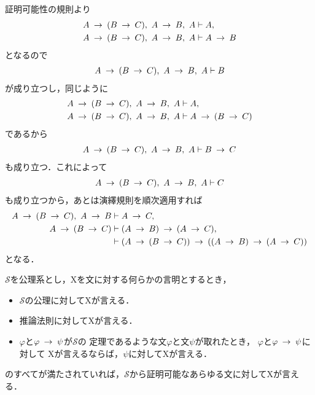 	\begin{prf}
		証明可能性の規則より
		\begin{align}
			A \rarrow (B \rarrow C),\ A \rarrow B,\ A
			&\vdash A, \\
			A \rarrow (B \rarrow C),\ A \rarrow B,\ A
			&\vdash A \rarrow B
		\end{align}
		となるので
		\begin{align}
			A \rarrow (B \rarrow C),\ A \rarrow B,\ A
			\vdash B
		\end{align}
		が成り立つし，同じように
		\begin{align}
			A \rarrow (B \rarrow C),\ A \rarrow B,\ A
			&\vdash A, \\
			A \rarrow (B \rarrow C),\ A \rarrow B,\ A
			&\vdash A \rarrow (B \rarrow C)
		\end{align}
		であるから
		\begin{align}
			A \rarrow (B \rarrow C),\ A \rarrow B,\ A
			\vdash B \rarrow C
		\end{align}
		も成り立つ．これによって
		\begin{align}
			A \rarrow (B \rarrow C),\ A \rarrow B,\ A
			\vdash C
		\end{align}
		も成り立つから，あとは演繹規則を順次適用すれば
		\begin{align}
			A \rarrow (B \rarrow C),\ A \rarrow B
			&\vdash A \rarrow C, \\
			A \rarrow (B \rarrow C)
			&\vdash (A \rarrow B) \rarrow (A \rarrow C), \\
			&\vdash (A \rarrow (B \rarrow C)) \rarrow ((A \rarrow B) \rarrow (A \rarrow C))
		\end{align}
		となる．
		\QED
	\end{prf}
	
	\begin{screen}
		\begin{metaaxm}[証明に対する構造的帰納法]
			$\mathscr{S}$を公理系とし，Xを文に対する何らかの言明とするとき，
			\begin{itemize}
				\item $\mathscr{S}$の公理に対してXが言える．
				\item 推論法則に対してXが言える．
				\item $\varphi$と$\varphi \rarrow \psi$が$\mathscr{S}$の
					定理であるような文$\varphi$と文$\psi$が取れたとき，
					$\varphi$と$\varphi \rarrow \psi$に対して
					Xが言えるならば，$\psi$に対してXが言える．
			\end{itemize}
			のすべてが満たされていれば，$\mathscr{S}$から証明可能なあらゆる文に対してXが言える．
		\end{metaaxm}
	\end{screen}
	
